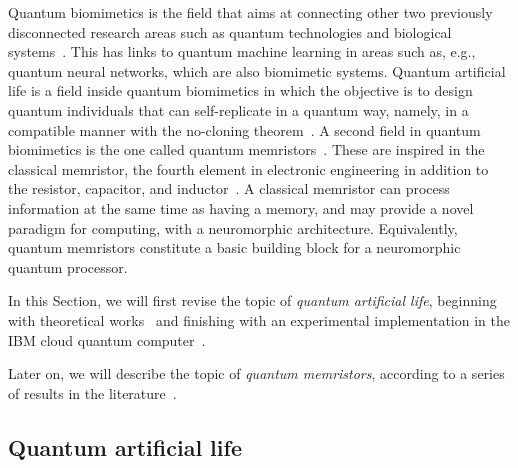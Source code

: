 \documentclass[12pt]{iopart}
\begin{document}
Quantum biomimetics is the field that aims at connecting other two previously disconnected research areas such as quantum technologies and biological systems~\cite{al1,al2}. This has links to quantum machine learning in areas such as, e.g., quantum neural networks, which are also biomimetic systems. Quantum artificial life is a field inside quantum biomimetics in which the objective is to design quantum individuals that can self-replicate in a quantum way, namely, in a compatible manner with the no-cloning theorem~\cite{qubiom1,qubiom2,qubiom3,WootersZurek}. A second field in quantum biomimetics is the one called quantum memristors~\cite{qmem1,qmem2,qmem3,qmem4}. These are inspired in the classical memristor, the fourth element in electronic engineering in addition to the resistor, capacitor, and inductor~\cite{DiVentraMemristors}. A classical memristor can process information at the same time as having a memory, and may provide a novel paradigm for computing, with a neuromorphic architecture. Equivalently, quantum memristors constitute a basic building block for a neuromorphic quantum processor. 

In this Section, we will first revise the topic of {\it quantum artificial life}, beginning with theoretical works~\cite{qubiom1,qubiom2} and finishing with an experimental implementation in the IBM cloud quantum computer~\cite{qubiom3}. 

Later on, we will describe the topic of {\it quantum memristors}, according to a series of results in the literature~\cite{qmem1,qmem2,qmem3,qmem4}.


\subsection{Quantum artificial life}
\end{document}
